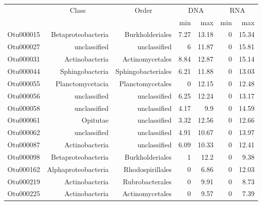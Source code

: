 \begin{table}[ht]
\centering
\begin{tabular}{crrrrrr}
  \hline
  & \multicolumn{1}{c}{Class} & \multicolumn{1}{c}{Order} & 
                      \multicolumn{2}{c}{DNA} & \multicolumn{2}{c}{RNA} \\
 & &  & min & max & min & max \\
 \hline
Otu000015 & Betaproteobacteria & Burkholderiales & 7.27 & 13.18 & 0 & 15.34 \\ 
  Otu000027 & unclassified & unclassified & 6 & 11.87 & 0 & 15.81 \\ 
  Otu000031 & Actinobacteria & Actinomycetales & 8.84 & 12.87 & 0 & 15.14 \\ 
  Otu000044 & Sphingobacteria & Sphingobacteriales & 6.21 & 11.88 & 0 & 13.03 \\ 
  Otu000055 & Planctomycetacia & Planctomycetales & 0 & 12.15 & 0 & 12.48 \\ 
  Otu000056 & unclassified & unclassified & 6.25 & 12.24 & 0 & 13.17 \\ 
  Otu000058 & unclassified & unclassified & 4.17 & 9.9 & 0 & 14.59 \\ 
  Otu000061 & Opitutae & unclassified & 3.32 & 12.56 & 0 & 12.66 \\ 
  Otu000062 & unclassified & unclassified & 4.91 & 10.67 & 0 & 13.97 \\ 
  Otu000087 & Actinobacteria & unclassified & 6.09 & 10.33 & 0 & 12.41 \\ 
  Otu000098 & Betaproteobacteria & Burkholderiales & 1 & 12.2 & 0 & 9.38 \\ 
  Otu000162 & Alphaproteobacteria & Rhodospirillales & 0 & 6.86 & 0 & 12.03 \\ 
  Otu000219 & Actinobacteria & Rubrobacterales & 0 & 9.91 & 0 & 8.73 \\ 
  Otu000225 & Actinobacteria & Actinomycetales & 0 & 9.57 & 0 & 7.39 \\ 
   \hline
\end{tabular}
\end{table}

